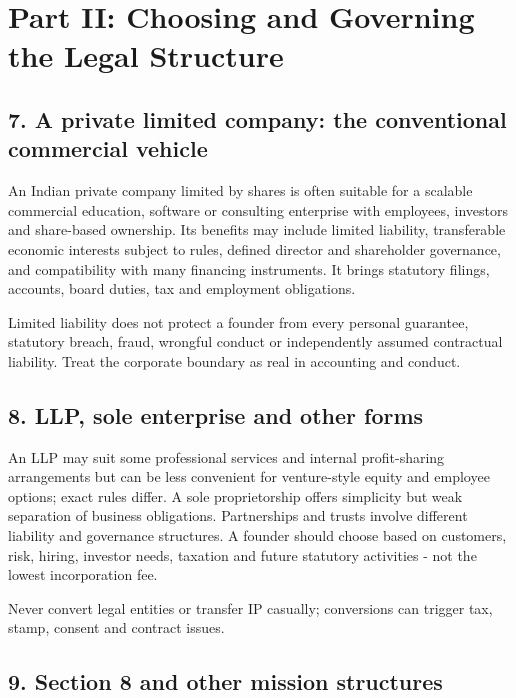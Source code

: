 \section*{Part II: Choosing and Governing the Legal Structure}

\subsection{7. A private limited company: the conventional commercial vehicle}

An Indian private company limited by shares is often suitable for a scalable commercial education, software or consulting enterprise with employees, investors and share-based ownership. Its benefits may include limited liability, transferable economic interests subject to rules, defined director and shareholder governance, and compatibility with many financing instruments. It brings statutory filings, accounts, board duties, tax and employment obligations.

Limited liability does not protect a founder from every personal guarantee, statutory breach, fraud, wrongful conduct or independently assumed contractual liability. Treat the corporate boundary as real in accounting and conduct.

\subsection{8. LLP, sole enterprise and other forms}

An LLP may suit some professional services and internal profit-sharing arrangements but can be less convenient for venture-style equity and employee options; exact rules differ. A sole proprietorship offers simplicity but weak separation of business obligations. Partnerships and trusts involve different liability and governance structures. A founder should choose based on customers, risk, hiring, investor needs, taxation and future statutory activities - not the lowest incorporation fee.

Never convert legal entities or transfer IP casually; conversions can trigger tax, stamp, consent and contract issues.

\subsection{9. Section 8 and other mission structures}

